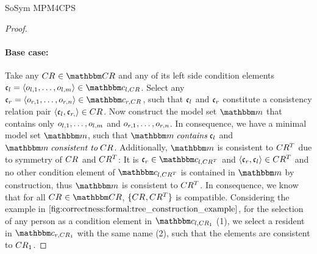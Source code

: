 \begin{copiedFrom}{SoSym MPM4CPS}
\begin{proof}
    \paragraph{Base case:}
    Take any $\consistencyrelation{CR}{} \in \consistencyrelationset{CR}$ and any of its left side condition elements $\conditionelement{c}{l} = \tupled{\object{o}{l,1}, \dots, \object{o}{l,m}} \in \condition{c}{l, \consistencyrelation{CR}{}}$.
    Select any $\conditionelement{c}{r} = \tupled{\object{o}{r,1}, \dots, \object{o}{r,n}} \in \condition{c}{r, \consistencyrelation{CR}{}}$, such that $\mathfrak{c}_{l}$ and $\mathfrak{c}_{r}$ constitute a consistency relation pair $\langle \mathfrak{c}_{l}, \mathfrak{c}_{r,} \rangle \in CR_{}$.
    Now construct the model set $\modelset{m}$ that contains only $o_{l,1}, \dots, o_{l,m}$ and $o_{r,1}, \dots, o_{r,n}$. %
    In consequence, we have a minimal model set $\modelset{m}$, such that $\modelset{m} \containsmath \conditionelement{c}{l}$ and $\modelset{m} \consistenttomath \consistencyrelation{CR}{}$.
    Additionally, $\modelset{m}$ is consistent to $CR^T_{}$ due to symmetry of $CR_{}$ and $CR^T_{}$: It is $\conditionelement{c}{r} \in \condition{c}{l,\consistencyrelation{CR^T}{}}$ and $\langle \mathfrak{c}_{r}, \mathfrak{c}_{l} \rangle \in CR^T_{}$ and no other condition element of $\condition{c}{l,\consistencyrelation{CR^T}{}}$ is contained in $\modelset{m}$ by construction, thus $\modelset{m}$ is consistent to $CR^T_{}$.
    In consequence, we know that for all $\consistencyrelation{CR}{} \in \consistencyrelationset{CR}$, $\{ CR_{}, CR^T_{} \}$ is compatible. 
    Considering the example in $\autoref{fig:correctness:formal:tree_construction_example}$, for the selection of any person as a condition element in $\condition{c}{l,\consistencyrelation{CR}{1}}$ (1), we select a resident in $\condition{c}{r,\consistencyrelation{CR}{1}}$ with the same name (2), such that the elements are consistent to $CR_{1}$.
    

\end{proof}
\end{copiedFrom}

